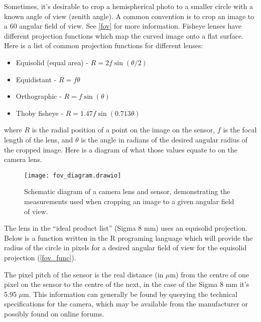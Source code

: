 \documentclass{article}
\newcommand\file[1]{\texttt{\underline{#1}}}
\begin{document}
Sometimes, it's desirable to crop a hemispherical photo to a smaller circle with a known angle of view (zenith angle). A common convention is to crop an image to a 60\textdegree{} angular field of view. See \autoref{fov} for more information. Fisheye lenses have different projection functions which map the curved image onto a flat surface. Here is a list of common projection functions for different lenses:

\begin{itemize}
	\item{Equisolid (equal area) - $R = 2f\sin{(\theta/2)}$}
	\item{Equidistant - $R = f\theta$}
	\item{Orthographic - $R = f\sin{(\theta)}$}
	\item{Thoby fisheye - $R = 1.47f\sin{(0.713\theta)}$}
\end{itemize}

where $R$ is the radial position of a point on the image on the sensor, $f$ is the focal length of the lens, and $\theta$ is the angle in radians of the desired angular radius of the cropped image. Here is a diagram of what those values equate to on the camera lens.

\begin{figure}[H]
\centering
	\texttt{[image: fov\_diagram.drawio]}
	\caption{Schematic diagram of a camera lens and sensor, demonstrating the measurements used when cropping an image to a given angular field of view.}
	\label{fov_diagram}
\end{figure}

The lens in the ``ideal product list'' (Sigma 8 mm) uses an equisolid projection. Below is a function written in the R programing language which will provide the radius of the circle in pixels for a desired angular field of view for the equisolid projection (\autoref{fov_func}).

\begin{minipage}{\linewidth}

\end{minipage}

The pixel pitch of the sensor is the real distance (in $\mu$m) from the centre of one pixel on the sensor to the centre of the next, in the case of the Sigma 8 mm it's 5.95 $\mu$m. This information can generally be found by querying the technical specifications for the camera, which may be available from the manufacturer or possibly found on online forums.
\end{document}

